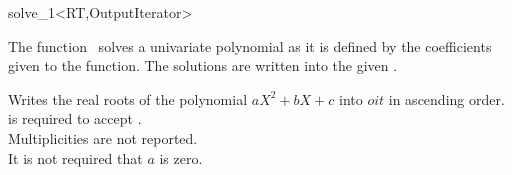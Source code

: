 \begin{ccRefFunction}{solve_1<RT,OutputIterator>}

\ccDefinition

The function \ccRefName\ solves a univariate polynomial as it is defined by the 
coefficients given to the function. The solutions are written into the given
. 


{
Writes the real roots of the polynomial $aX^2+bX+c$ into $oit$ in ascending order. \\
 is required to accept . \\
Multiplicities are not reported. \\
It is not required that $a$ is zero. \\
} 

\ccSeeAlso
{}\\
\\
\\
\\
\\
\end{ccRefFunction}
